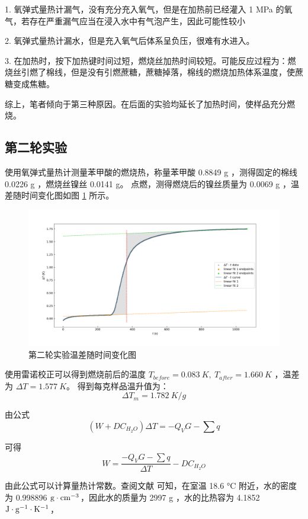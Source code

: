 \documentclass[cn,hazy,pku,12pt,normal,math=newtx,cite=super]{elegantnote}
\begin{document}
1. 氧弹式量热计漏气，没有充分充入氧气，但是在加热前已经灌入 1 MPa 的氧气，若存在严重漏气应当在浸入水中有气泡产生，因此可能性较小

2. 氧弹式量热计漏水，但是充入氧气后体系呈负压，很难有水进入。

3. 在加热时，按下加热键时间过短，燃烧丝加热时间较短。可能反应过程为：燃烧丝引燃了棉线，但是没有引燃蔗糖，蔗糖掉落，棉线的燃烧加热体系温度，使蔗糖变成焦糖。

综上，笔者倾向于第三种原因。在后面的实验均延长了加热时间，使样品充分燃烧。

\subsection[short]{第二轮实验}\label{114}

使用氧弹式量热计测量苯甲酸的燃烧热，称量苯甲酸 0.8849 g ，测得固定的棉线 0.0226 g ，燃烧丝镍丝 0.0141 g。
点燃，测得燃烧后的镍丝质量为 0.0069 g ，温差随时间变化图如图 \ref{6} 所示。

\begin{figure}[htbp]
    \centering
    \includegraphics[width = .90\textwidth]{image/r2.png}
    \caption{第二轮实验温差随时间变化图}\label{6}
\end{figure}


使用雷诺校正可以得到燃烧前后的温度 $T_{before} = 0.083\ K,\ T_{after} = 1.660\ K$ ，温差为 $\Delta T = 1.577\ K$。
得到每克样品温升值为：
$$
\Delta T_m = 1.782\ K/g
$$

由公式
$$
(W+DC_{H_2O})\Delta T = -Q_VG-\sum{q}
$$

可得
$$
W = \frac{-Q_VG-\sum{q}}{\Delta T}-DC_{H_2O}
$$

由此公式可以计算量热计常数。查阅文献 \cite{CRC} 可知，在室温 18.6 °C 附近，水的密度为 0.998896 $\rm g\cdot cm^{-3}$，因此水的质量为 2997 g
，水的比热容为 4.1852 $\rm J\cdot g^{-1}\cdot K^{-1}$，
\end{document}
